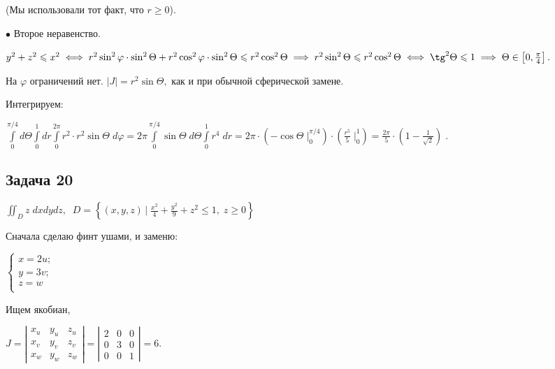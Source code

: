 \documentclass[a4paper, fleqn]{article}
\begin{document}
    (Мы использовали тот факт, что $r \geq 0$).
    
    $\bullet$ Второе неравенство.
    
    $y^2 + z^2 \leq x^2 \iff
    r^2 \sin^2  \varphi \cdot \sin^2  \Theta +
    r^2 \cos^2  \varphi \cdot  \sin^2  \Theta \leq 
    r^2 \cos^2 \Theta \implies r^2 \sin^2 \Theta \leq r^2 \cos^2 \Theta \iff \tg^2 \Theta \leq 1 \implies \Theta \in \left[ 0, \frac{\pi}{4} \right].$
    
    На $\varphi$ ограничений нет. $|J| = r^2 \sin \Theta,$ как и при обычной сферической замене.
    
    Интегрируем:
    
    $\displaystyle \int \limits_{0}^{\pi /4} d\Theta  \int \limits_{0}^{1} dr  \int \limits_{0}^{2 \pi}   r^2 \cdot r^2 \sin \Theta \; d \varphi  = 2 \pi \int \limits_{0}^{\pi /4} \sin \Theta \;  d\Theta  \int \limits_{0}^{1}  r^4   \; dr = 2 \pi \cdot  \left( -\cos \Theta \;  \Bigg|_{0}^{\pi /4} \right) \cdot \left( \frac{r^5}{5} \; \Bigg|_0^1 \right) = \boxed{\frac{2\pi}{5} \cdot \left(1 - \frac{1}{\sqrt{2}} \right)} \; .$
    
    
    
    
    \subsection*{Задача 20}
    
    $\iint_{D} z \; dxdydz, \; \; D = \left\{(x,y,z) \, \Big| \;  \frac{x^2}{4} + \frac{y^2 }{9} + z^2 \leq 1, \; z \geq 0 \right\} $
    
    Сначала сделаю финт ушами, и заменю:
    
    $
    \begin{cases}
    x = 2 u;\\
    y = 3 v;\\
    z = w\\
    \end{cases}
    $
    
    Ищем якобиан,
    
    $J =  \left| \begin{matrix} x_u & y_u & z_u \\ x_v & y_v & z_v \\  x_w & y_w & z_w  \end{matrix} \right| = 
      \left| \begin{matrix} 2 & 0 & 0 \\ 0 & 3 & 0 \\  0 & 0 & 1  \end{matrix} \right| = 6.$
    
\end{document}
